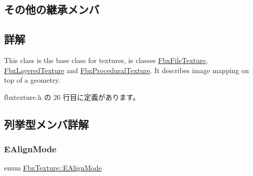 \subsection*{その他の継承メンバ}


\subsection{詳解}
This class is the base class for textures, ie classes \hyperlink{class_fbx_file_texture}{Fbx\+File\+Texture}, \hyperlink{class_fbx_layered_texture}{Fbx\+Layered\+Texture} and \hyperlink{class_fbx_procedural_texture}{Fbx\+Procedural\+Texture}. It describes image mapping on top of a geometry. 

 fbxtexture.\+h の 26 行目に定義があります。



\subsection{列挙型メンバ詳解}
\mbox{\label{class_fbx_texture_ab2c33e435866abe53920d298cbf681bb}} 
\subsubsection{\texorpdfstring{E\+Align\+Mode}{EAlignMode}}
{\footnotesize\ttfamily enum \hyperlink{class_fbx_texture_ab2c33e435866abe53920d298cbf681bb}{Fbx\+Texture\+::\+E\+Align\+Mode}}

